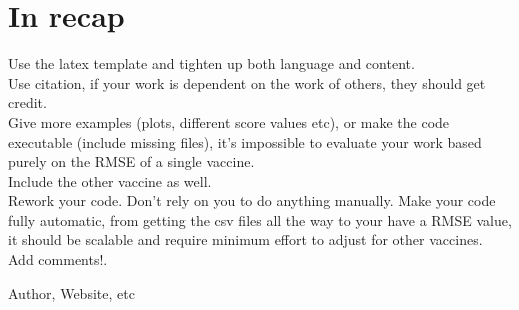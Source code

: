 \documentclass[11pt]{article} %
\begin{document}
\section*{In recap}
Use the latex template and tighten up both language and content.\\
Use citation, if your work is dependent on the work of others, they should get credit.\\
Give more examples (plots, different score values etc), or make the code executable (include missing files), it's impossible to evaluate your work based purely on the RMSE of a single vaccine.\\
Include the other vaccine as well.\\
Rework your code. Don't rely on you to do anything manually. Make your code fully automatic, from getting the csv files all the way to your have a RMSE value, it should be scalable and require minimum effort to adjust for other vaccines. Add comments!.
\begin{thebibliography}{9}

  Author,
  Website,
  etc

\end{thebibliography}
\end{document}
